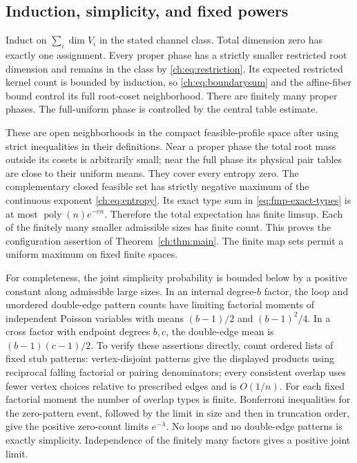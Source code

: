 \subsection{Induction, simplicity, and fixed powers}
Induct on $\sum_i\dim V_i$ in the stated channel class. Total dimension zero has exactly one assignment. Every proper phase has a strictly smaller restricted root dimension and remains in the class by \eqref{ch:eq:restriction}. Its expected restricted kernel count is bounded by induction, so \eqref{ch:eq:boundarysum} and the affine-fiber bound control its full root-coset neighborhood. There are finitely many proper phases. The full-uniform phase is controlled by the central table estimate.

These are open neighborhoods in the compact feasible-profile space after using strict inequalities in their definitions. Near a proper phase the total root mass outside its cosets is arbitrarily small; near the full phase its physical pair tables are close to their uniform means. They cover every entropy zero. The complementary closed feasible set has strictly negative maximum of the continuous exponent \eqref{ch:eq:entropy}. Its exact type sum in \eqref{eq:fmp-exact-types} is at most $\operatorname{poly}(n)e^{-cn}$. Therefore the total expectation has finite limsup. Each of the finitely many smaller admissible sizes has finite count. This proves the configuration assertion of Theorem~\ref{ch:thm:main}. The finite map sets permit a uniform maximum on fixed finite spaces.

For completeness, the joint simplicity probability is bounded below by a positive constant along admissible large sizes. In an internal degree-$b$ factor, the loop and unordered double-edge pattern counts have limiting factorial moments of independent Poisson variables with means $(b-1)/2$ and $(b-1)^2/4$. In a cross factor with endpoint degrees $b,c$, the double-edge mean is $(b-1)(c-1)/2$. To verify these assertions directly, count ordered lists of fixed stub patterns: vertex-disjoint patterns give the displayed products using reciprocal falling factorial or pairing denominators; every consistent overlap uses fewer vertex choices relative to prescribed edges and is $O(1/n)$. For each fixed factorial moment the number of overlap types is finite. Bonferroni inequalities for the zero-pattern event, followed by the limit in size and then in truncation order, give the positive zero-count limits $e^{-\lambda}$. No loops and no double-edge patterns is exactly simplicity. Independence of the finitely many factors gives a positive joint limit.

